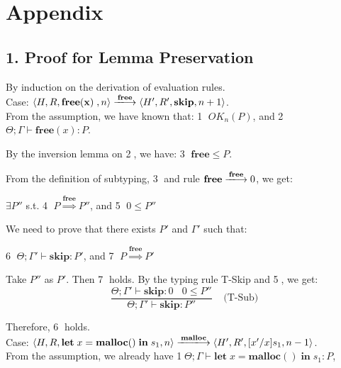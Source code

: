 \documentclass[english]{jssst_ppl} %
\newcommand\LET{\mathbf{let}\;}
\newcommand\FREE{\mathbf{free(x)}\;}
\newcommand\IN{\mathbf{in}\;}
\newcommand\SKIP{\mathbf{skip}}
\newcommand\Rtab{\; \; \; \;}
\newcommand\MALLOC{\mathbf{malloc()}\;}
\newcommand\Malloc{\mathbf{malloc}}
\newcommand\Free{\mathbf{free}}
\newcommand\Cirx{(x)}
\theoremstyle{definition}
\begin{document}



\newpage
\appendix
\section*{Appendix}
\subsection*{1. Proof for Lemma Preservation}

By induction on the derivation of evaluation rules.\\

\noindent Case: $\langle H, R, \FREE, n \rangle \xlongrightarrow{\Free} \langle H', R', \SKIP, n + 1 \rangle $. \\

From the assumption, we have known that: \textcircled{1} $OK_{n}(P)$, and \textcircled{2} $\Theta; \Gamma \vdash \Free\Cirx:P$.

By the inversion lemma on \textcircled{2}, we have: \textcircled{3} $\Free \le P$.

From the definition of subtyping, \textcircled{3} and rule $\Free \xlongrightarrow{\Free} 0$, we get:
\begin{center}
$\exists P''$ s.t. \textcircled{4} $P \overset{\text{$\Free$}}{\Longrightarrow} P''$,  and \textcircled{5} $0 \le P''$
\end{center}

We need to prove that there exists $P'$ and $\Gamma'$ such that:
\begin{center}
\textcircled{6} $\Theta; \Gamma' \vdash \SKIP: P'$,  and \textcircled{7} $P \overset{\text{$\Free$}}{\Longrightarrow} P'$
\end{center}

Take $P''$ as $P'$. Then \textcircled{7} holds. By the typing rule T-Skip and \textcircled{5}, we get:
$$
   \frac{\Theta; \Gamma' \vdash \SKIP : 0 \ \ \ \  0 \le P''}
   {\Theta; \Gamma' \vdash \SKIP : P''}
   \Rtab \mbox{(T-Sub)}
$$

Therefore, \textcircled{6} holds. \\

\noindent Case: $\langle H, R, \LET x = \MALLOC \IN s_{1}, n \rangle \xlongrightarrow{\Malloc} \langle H', R', [x'/x]s_{1}, n - 1  \rangle $.\\

From the assumption, we already have \textcircled{1}$\Theta; \Gamma \vdash \LET x = \MALLOC \IN s_{1} : P$,
\end{document}
